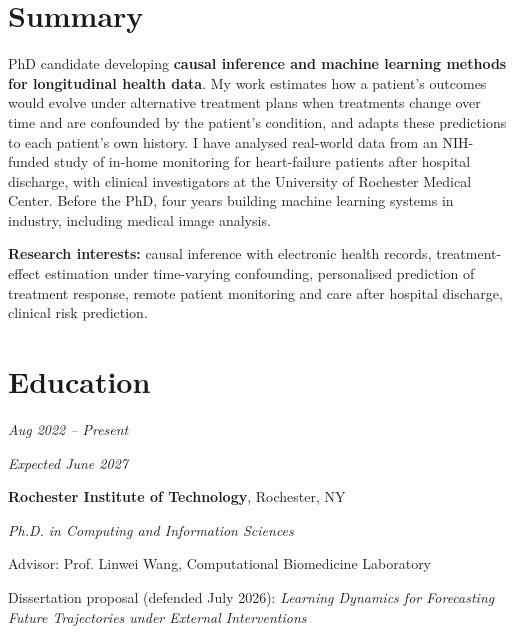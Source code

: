 \documentclass[10pt, letterpaper]{article}
\begin{document}
    

    \vspace{0.3 cm - 0.3 cm}


    \section{Summary}
    \begin{onecolentry}
        PhD candidate developing \textbf{causal inference and machine learning methods for longitudinal health
        data}. My work estimates how a patient's outcomes would evolve under alternative treatment plans when
        treatments change over time and are confounded by the patient's condition, and adapts these predictions
        to each patient's own history. I have analysed real-world data from an NIH-funded study of in-home
        monitoring for heart-failure patients after hospital discharge, with clinical investigators at the
        University of Rochester Medical Center. Before the PhD, four years building machine learning systems in
        industry, including medical image analysis.
    \end{onecolentry}

    \vspace{0.2 cm}

    \begin{onecolentry}
        \textbf{Research interests:} causal inference with electronic health records, treatment-effect estimation
        under time-varying confounding, personalised prediction of treatment response, remote patient monitoring
        and care after hospital discharge, clinical risk prediction.
    \end{onecolentry}


    \section{Education}
    \begin{twocolentry}{
        \textit{Aug 2022 – Present}

        \textit{Expected June 2027}}
        \textbf{Rochester Institute of Technology}, Rochester, NY

        \textit{Ph.D. in Computing and Information Sciences}
    \end{twocolentry}

    \vspace{0.10 cm}
    \begin{onecolentry}
        \begin{highlights}
            \item Advisor: Prof. Linwei Wang, Computational Biomedicine Laboratory
            \item Dissertation proposal (defended July 2026): \textit{Learning Dynamics for Forecasting Future
            Trajectories under External Interventions}
        \end{highlights}
    \end{onecolentry}
\end{document}
